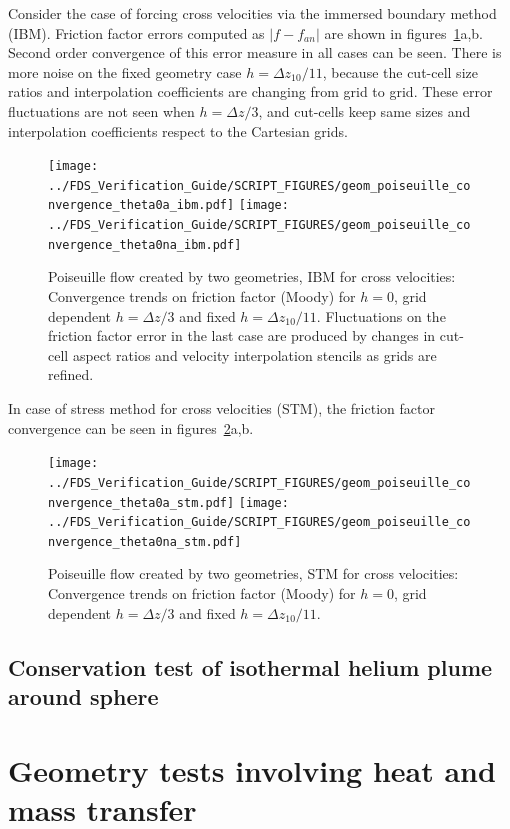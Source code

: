 \documentclass[11pt]{book}
\begin{document}
Consider the case of forcing cross velocities via the immersed boundary method (IBM). Friction factor errors computed as $|f-f_{an}|$ are shown in figures~\ref{Fig:PoiseConvg}a,b. Second order convergence of this error measure in all cases can be seen. There is more noise on the fixed geometry case $h=\Delta z_{10}/11$, because the cut-cell size ratios and interpolation coefficients are changing from grid to grid. These error fluctuations are not seen when $h=\Delta z /3$, and cut-cells keep same sizes and interpolation coefficients respect to the Cartesian grids.
%
\begin{figure}[h]
      \centering
      \texttt{[image: ../FDS\_Verification\_Guide/SCRIPT\_FIGURES/geom\_poiseuille\_convergence\_theta0a\_ibm.pdf]}
      \texttt{[image: ../FDS\_Verification\_Guide/SCRIPT\_FIGURES/geom\_poiseuille\_convergence\_theta0na\_ibm.pdf]}
      \caption{Poiseuille flow created by two geometries, IBM for cross velocities: Convergence trends on friction factor (Moody) for $h=0$, grid dependent $h=\Delta z/3$ and fixed $h=\Delta z_{10}/11$. Fluctuations on the friction factor error in the last case are produced by changes in cut-cell aspect ratios and velocity interpolation stencils as grids are refined.}
      \label{Fig:PoiseConvg}
\end{figure}
%

In case of stress method for cross velocities (STM), the friction factor convergence can be seen in figures~\ref{Fig:PoiseConvg2}a,b.
%
\begin{figure}[h]
      \centering
      \texttt{[image: ../FDS\_Verification\_Guide/SCRIPT\_FIGURES/geom\_poiseuille\_convergence\_theta0a\_stm.pdf]}
      \texttt{[image: ../FDS\_Verification\_Guide/SCRIPT\_FIGURES/geom\_poiseuille\_convergence\_theta0na\_stm.pdf]}
      \caption{Poiseuille flow created by two geometries, STM for cross velocities: Convergence trends on friction factor (Moody) for $h=0$, grid dependent $h=\Delta z/3$ and fixed $h=\Delta z_{10}/11$.}
      \label{Fig:PoiseConvg2}
\end{figure}
%


\subsection{Conservation test of isothermal helium plume around sphere}


\section{Geometry tests involving heat and mass transfer}
\end{document}
